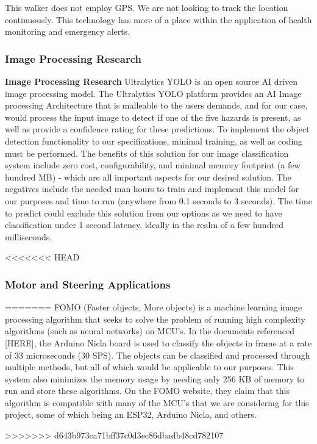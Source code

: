 \noindent This walker does not employ GPS. We are not looking to track the location continuously. This technology has more of a place within the application of health monitoring and emergency alerts.\\

\subsubsection{Image Processing Research}
\noindent \textbf{Image Processing Research}
\newline
 Ultralytics YOLO is an open source AI driven image processing model. The Ultralytics YOLO platform provides an AI Image processing Architecture that is malleable to the users demands, and for our case, would process the input image to detect if one of the five hazards is present, as well as provide a confidence rating for these predictions. To implement the object detection functionality to our specifications, minimal training, as well as coding must be performed. The benefits of this solution for our image classification system include zero cost, configurability, and minimal memory footprint (a few hundred MB) - which are all important aspects for our desired solution. The negatives include the needed man hours to train and implement this model for our purposes and time to run (anywhere from 0.1 seconds to 3 seconds). The time to predict could exclude this solution from our options as we need to have classification under 1 second latency, ideally in the realm of a few hundred milliseconds. 
\newline 

<<<<<<< HEAD
\subsubsection{Motor and Steering Applications}
=======
\newline 
\noindent FOMO (Faster objects, More objects) is a machine learning image processing algorithm that seeks to solve the problem of running high complexity algorithms (such as neural networks) on MCU's. In the documents referenced [HERE], the Arduino Nicla board is used to classify the objects in frame at a rate of 33 microseconds (30 SPS). The objects can be classified and processed through multiple methods, but all of which would be applicable to our purposes. This system also minimizes the memory usage by needing only 256 KB of memory to run and store these algorithms. On the FOMO website, they claim that this algorithm is compatible with many of the MCU's that we are considering for this project, some of which being an ESP32, Arduino Nicla, and others.
\newline 

>>>>>>> d643b973ca71bff37c0d3ec86dbadb48cd782107
